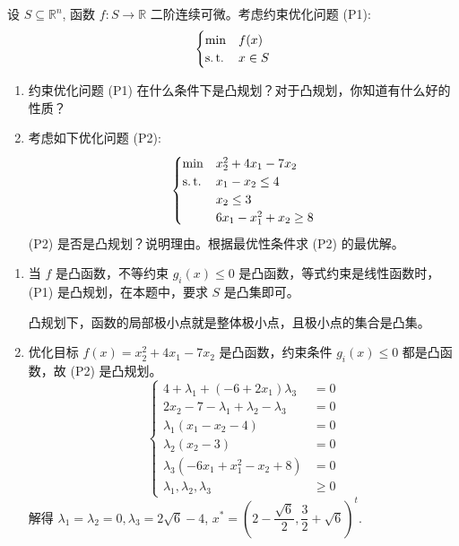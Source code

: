\begin{Problem}
    设 $S \subseteq \mathbb{R}^n$, 函数 $f: S \to \mathbb{R}$ 二阶连续可微。考虑约束优化问题 (P1):
    \[
        \begin{cases}
            \min & f(x)\\
            \operatorname{s.t.} & x \in S
        \end{cases}
    \]
    \begin{enumerate}[label={(\arabic*)}]
        \item 约束优化问题 (P1) 在什么条件下是凸规划？对于凸规划，你知道有什么好的性质？
        \item 考虑如下优化问题 (P2):
        \[
            \begin{cases}
                \min & x_2^2 + 4x_1 - 7x_2\\
                \operatorname{s.t.} & x_1 - x_2 \le 4\\
                &x_2 \le 3\\
                &6x_1 - x_1^2 + x_2 \ge 8
            \end{cases}
        \]
        (P2) 是否是凸规划？说明理由。根据最优性条件求 (P2) 的最优解。
    \end{enumerate}

    \Answer
    \leavevmode
    \begin{enumerate}[label={(\arabic*)}]
        \item 当 $f$ 是凸函数，不等约束 $g_i(x) \le 0$ 是凸函数，等式约束是线性函数时，(P1) 是凸规划，在本题中，要求 $S$ 是凸集即可。
        
        凸规划下，函数的局部极小点就是整体极小点，且极小点的集合是凸集。
        \item 优化目标 $f(x) = x_2^2 + 4x_1 - 7x_2$ 是凸函数，约束条件 $g_i(x) \le 0$ 都是凸函数，故 (P2) 是凸规划。
        \[
            \begin{cases}
                4 + \lambda_1 + (-6 + 2x_1)\lambda_3 &= 0\\
                2x_2 - 7 - \lambda_1 + \lambda_2 - \lambda_3 &= 0\\
                \lambda_1(x_1 - x_2 - 4) &= 0\\
                \lambda_2(x_2 - 3) &= 0\\
                \lambda_3(-6x_1 + x_1^2 - x_2 + 8) &= 0\\
                \lambda_1, \lambda_2, \lambda_3 &\ge 0
            \end{cases}
        \]
        解得 $\lambda_1 = \lambda_2 = 0, \lambda_3 = 2\sqrt{6} - 4$, $x^* = \left(2 - \dfrac{\sqrt{6}}{2}, \dfrac{3}{2} + \sqrt{6}\right)^t$.
    \end{enumerate}
\end{Problem}

